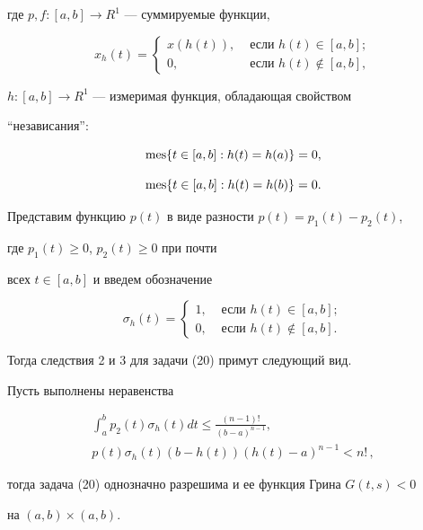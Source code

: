 где $p,f:[a,b]\to R^1$ --- суммируемые функции, 


$$ 


x_h(t)=


\begin{cases} 


x(h(t)),&\text{ если }h(t)\in[a,b];\\ 


0, &\text{ если }h(t)\notin[a,b], 


\end{cases} 


$$ 


$h:[a,b]\to R^1$ --- измеримая функция, обладающая свойством 


``независания'': 


$$ 


\mes\{t\in[a,b]:h(t)=h(a)\}=0, 


$$ 


$$ 


\mes\{t\in[a,b]:h(t)=h(b)\}=0. 


$$ 


Представим функцию $p(t)$ в виде разности $p(t)=p_1(t)-p_2(t)$, 


где $p_1(t)\ge 0$, $p_2(t)\ge 0$ при почти 


всех $t\in[a,b]$ и введем обозначение 


$$ 


\sigma_h(t)= 


\begin{cases} 


1, &\text{ если }h(t)\in[a,b];\\ 


0, &\text{ если }h(t)\notin[a,b]. 


\end{cases} 


$$ 


Тогда следствия 2 и 3 для задачи (20) примут следующий вид. 


 


\begin{cor} Пусть выполнены неравенства 


\begin{gather*} 


\int^b_ap_2(t)\sigma_h(t)dt \le \frac{(n-1)!}{(b-a)^{n-1}},\\ 


p(t)\sigma_h(t)(b-h(t))(h(t)-a)^{n-1} < n!\, , 


\end{gather*} 


тогда задача (20) однозначно разрешима и ее функция Грина $G(t,s)<0$ 


на $(a,b)\times(a,b)$. 


\end{cor} 


